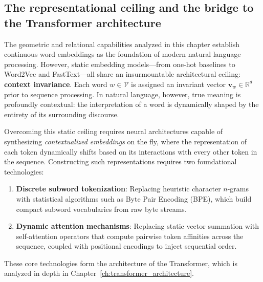 \documentclass[../../../main.tex]{subfiles}
\begin{document}
\clearpage



\subsection{The representational ceiling and the bridge to the Transformer architecture}
\label{subsec:bridge_to_transformer}

The geometric and relational capabilities analyzed in this chapter establish continuous word embeddings as the foundation of modern natural language processing. However, static embedding models—from one-hot baselines to Word2Vec and FastText—all share an insurmountable architectural ceiling: \textbf{context invariance}. Each word $w \in \mathcal{V}$ is assigned an invariant vector $\mathbf{v}_w \in \mathbb{R}^d$ prior to sequence processing. In natural language, however, true meaning is profoundly contextual: the interpretation of a word is dynamically shaped by the entirety of its surrounding discourse.

Overcoming this static ceiling requires neural architectures capable of synthesizing \textit{contextualized embeddings} on the fly, where the representation of each token dynamically shifts based on its interactions with every other token in the sequence. Constructing such representations requires two foundational technologies:
\begin{enumerate}
    \item \textbf{Discrete subword tokenization}: Replacing heuristic character $n$-grams with statistical algorithms such as Byte Pair Encoding (BPE), which build compact subword vocabularies from raw byte streams.
    \item \textbf{Dynamic attention mechanisms}: Replacing static vector summation with self-attention operators that compute pairwise token affinities across the sequence, coupled with positional encodings to inject sequential order.
\end{enumerate}
These core technologies form the architecture of the Transformer, which is analyzed in depth in Chapter~\ref{ch:transformer_architecture}.


\clearpage\thispagestyle{empty}\null\clearpage
\end{document}
